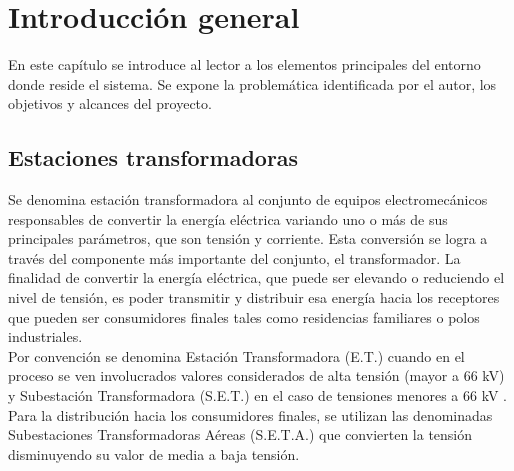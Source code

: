 \chapter{Introducción general} %

\label{Chapter1} %
\label{IntroGeneral}


\newcommand{\keyword}[1]{\textbf{#1}}
\newcommand{\tabhead}[1]{\textbf{#1}}
\newcommand{\code}[1]{\texttt{#1}}
\newcommand{\file}[1]{\texttt{\bfseries#1}}
\newcommand{\option}[1]{\texttt{\itshape#1}}
\newcommand{\grados}{$^{\circ}$}


En este cap\'{i}tulo se introduce al lector a los elementos principales del entorno donde reside el sistema.
Se expone la problem\'{a}tica identificada por el autor, los objetivos y alcances del proyecto.\\
\section{Estaciones transformadoras}

Se denomina estación transformadora al conjunto de equipos electromecánicos responsables de convertir la energía eléctrica variando uno o más de sus principales parámetros, que son tensión y corriente. Esta conversión se logra a través del componente más importante del conjunto, el transformador. La finalidad de convertir la energía eléctrica, que puede ser elevando o reduciendo el nivel de tensión, es poder transmitir y distribuir esa energía hacia los receptores que pueden ser consumidores finales tales como residencias familiares o polos industriales.\\

Por convención se denomina Estación Transformadora (E.T.) cuando en el proceso se ven involucrados valores considerados de alta tensión (mayor a 66 kV) y Subestación Transformadora (S.E.T.) en el caso de tensiones menores a 66 kV \citep{AEA:1}.\\
Para la distribución hacia los consumidores finales, se utilizan las denominadas Subestaciones Transformadoras Aéreas (S.E.T.A.) que convierten la tensión disminuyendo su valor de media a baja tensión.\\

